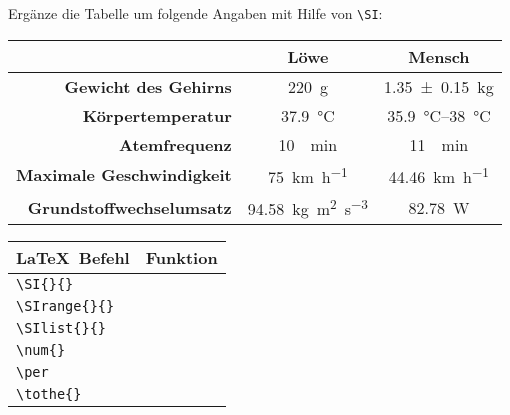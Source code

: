 \documentclass["WS\space 16-17\space -\space LaTeX-Kurs\space -\space Praesentation\space -\space 3.tex"]{subfiles}
\begin{document}
\begin{frame}[fragile]
	\vspace{-0.3cm}
	\begin{Aufgabe}
		Ergänze die Tabelle um folgende Angaben mit Hilfe von \lstinline[basicstyle=\normalfont\normalsize]|\SI|:
	\end{Aufgabe}
	\begin{outputbox}
		\begin{center}
			\begin{tabular}{rcc}
				\hline
				&	\textbf{Löwe}										& \textbf{Mensch} 						\\ \hline
				\textbf{Gewicht des Gehirns}		&	\SI{220}{\g}										& \SI{1.35 \pm 0.15}{\kg}				\\ 
				\textbf{Körpertemperatur}			&	\SI{37.9}{\degreeCelsius}							& \SIrange{35.9}{38}{\degreeCelsius}	\\
				\textbf{Atemfrequenz}				&	\SI{10}{\per \minute}								& \SI{11}{\per\minute} 					\\
				\textbf{Maximale Geschwindigkeit}	&	\SI{75}{\km\per\hour}								& \SI{44.46}{\km\per\hour} 				\\ 
				\textbf{Grundstoffwechselumsatz}	&	\SI{94.58}{\kg\metre\squared\per\second\tothe{3}}	&  \SI{82.78}{\watt}\\
				\hline
			\end{tabular}
		\end{center}
	\end{outputbox}

	\btVFill\Befehle
	\begin{center}
		\begin{tabular}{ll}
			\toprule
			\LaTeX\ Befehl				&	Funktion						\\ \midrule
			\lstinline|\SI{}{}|			&									\\
			\lstinline|\SIrange{}{}|	&									\\
			\lstinline|\SIlist{}{}|		&									\\
			\lstinline|\num{}|			&									\\
			\lstinline|\per|			&									\\
			\lstinline|\tothe{}|		&									\\
			\bottomrule
		\end{tabular}
	\end{center}
	\vspace{0.1cm}
\end{frame}
\end{document}
